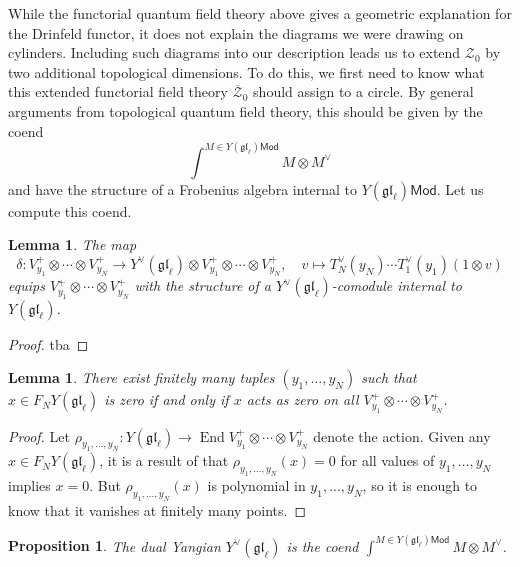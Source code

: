 \documentclass[11pt]{report}
\newtheorem{lemma}[theorem]{Lemma}
\newtheorem{prop}[theorem]{Proposition}
\theoremstyle{definition}
\theoremstyle{remark}
\theoremstyle{remark}
\newcommand{\End}{\operatorname{End}}
\begin{document}
While the functorial quantum field theory above gives a geometric explanation for the Drinfeld functor, it does not explain the diagrams we were drawing on cylinders. Including such diagrams into our description leads us to extend $\mathcal{Z}_0$ by two additional topological dimensions. To do this, we first need to know what this extended functorial field theory $\overline{\mathcal{Z}}_0$ should assign to a circle. By general arguments from topological quantum field theory, this should be given by the coend
\begin{equation*}
\int^{M \in Y(\mathfrak{gl}_\ell)\mathsf{Mod}} M \otimes M^\vee
\end{equation*}
and have the structure of a Frobenius algebra internal to $Y(\mathfrak{gl}_\ell)\mathsf{Mod}$. Let us compute this coend.

\begin{lemma}
The map
\begin{equation*}
\delta: V_{y_1}^+ \otimes \cdots \otimes V_{y_N}^+ \to Y^\vee(\mathfrak{gl}_\ell) \otimes V_{y_1}^+ \otimes \cdots \otimes V_{y_N}^+, \quad v \mapsto T_N^\vee(y_N) \cdots T_1^\vee(y_1)(1 \otimes v)
\end{equation*}
equips $V_{y_1}^+ \otimes \cdots \otimes V_{y_N}^+$ with the structure of a $Y^\vee(\mathfrak{gl}_\ell)$-comodule internal to $Y(\mathfrak{gl}_\ell)$.
\end{lemma}

\begin{proof}
tba
\end{proof}

\begin{lemma}
There exist finitely many tuples $(y_1,...,y_N)$ such that $x \in F_N Y(\mathfrak{gl}_\ell)$ is zero if and only if $x$ acts as zero on all $V_{y_1}^+ \otimes \cdots \otimes V_{y_N}^+$.
\end{lemma}

\begin{proof}
Let $\rho_{y_1,...,y_N}: Y(\mathfrak{gl}_\ell) \to \End V_{y_1}^+ \otimes \cdots \otimes V_{y_N}^+$ denote the action. Given any $x \in F_N Y(\mathfrak{gl}_\ell)$, it is a result of \cite{article:nazarov:2019} that $\rho_{y_1,...,y_N}(x) = 0$ for all values of $y_1,...,y_N$ implies $x = 0$. But $\rho_{y_1,...,y_N}(x)$ is polynomial in $y_1,...,y_N$, so it is enough to know that it vanishes at finitely many points.
\end{proof}

\begin{prop}
The dual Yangian $Y^\vee(\mathfrak{gl}_\ell)$ is the coend $\int^{M \in Y(\mathfrak{gl}_\ell)\mathsf{Mod}} M \otimes M^\vee$.
\end{prop}
\end{document}
